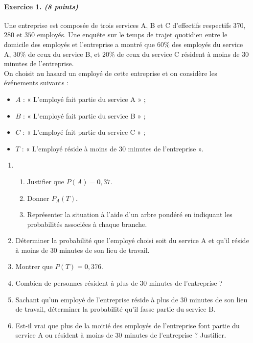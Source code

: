 \documentclass[11pt]{article}
\begin{document}
\paragraph{Exercice 1. \emph{(8 points)}} Une entreprise est composée de trois services A, B
et C d'effectifs respectifs $370$, $280$ et $350$ employés. Une enquête sur le
temps de trajet quotidien entre le domicile des employés et l'entreprise a
montré que $60$\% des employés du service A, $30$\% de ceux du service B, et
$20$\% de ceux du service C résident à moins de $30$ minutes de l'entreprise.\\
On choisit au hasard un employé de cette entreprise et on considère les
événements suivants :
\begin{itemize}
  \item $A$ : « L'employé fait partie du service A » ;
  \item $B$ : « L'employé fait partie du service B » ;
  \item $C$ : « L'employé fait partie du service C » ;
  \item $T$ : « L'employé réside à moins de $30$ minutes de l'entreprise ».
\end{itemize}
\begin{enumerate}
  \item \begin{enumerate}
      \item Justifier que $P(A)=0,37$.
      \item Donner $P_A(T)$.
      \item Représenter la situation à l'aide d'un arbre pondéré en indiquant
        les probabilités associées à chaque branche.
    \end{enumerate}
  \item Déterminer la probabilité que l'employé choisi soit du service A et
    qu'il réside à moins de $30$ minutes de son lieu de travail.
  \item Montrer que $P(T)=0,376$.
  \item Combien de personnes résident à plus de $30$ minutes de l'entreprise ?
  \item Sachant qu'un employé de l'entreprise réside à plus de $30$ minutes de
    son lieu de travail, déterminer la probabilité qu'il fasse partie du service
    B.
  \item Est-il vrai que plus de la moitié des employés de l'entreprise font
    partie du service A ou résident à moins de $30$ minutes de l'entreprise ?
    Justifier.
\end{enumerate}
\end{document}
